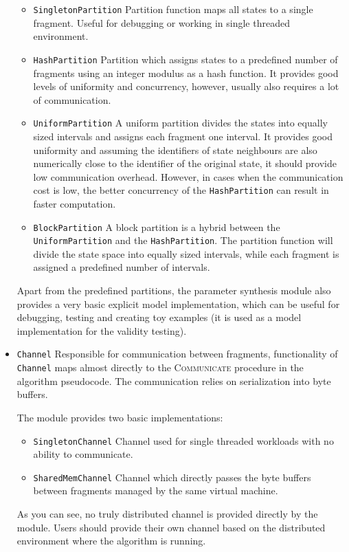 \begin{itemize}
	\begin{itemize}
		\item \texttt{SingletonPartition} Partition function maps all states to a single fragment. Useful for debugging or working in single threaded environment.
		\item \texttt{HashPartition} Partition which assigns states to a predefined number of fragments using an integer modulus as a hash function. It provides good levels of uniformity and concurrency, however, usually also requires a lot of communication.
		\item \texttt{UniformPartition} A uniform partition divides the states into equally sized intervals and assigns each fragment one interval. It provides good uniformity and assuming the identifiers of state neighbours are also numerically close to the identifier of the original state, it should provide low communication overhead. However, in cases when the communication cost is low, the better concurrency of the \texttt{HashPartition} can result in faster computation.
		\item \texttt{BlockPartition} A block partition is a hybrid between the \texttt{UniformPartition} and the \texttt{HashPartition}. The partition function will divide the state space into equally sized intervals, while each fragment is assigned a predefined number of intervals.
	\end{itemize}

	Apart from the predefined partitions, the parameter synthesis module also provides a very basic explicit model implementation, which can be useful for debugging, testing and creating toy examples (it is used as a model implementation for the validity testing).

	\item \texttt{Channel} Responsible for communication between fragments, functionality of \texttt{Channel} maps almost directly to the \textsc{Communicate} procedure in the algorithm pseudocode. The communication relies on serialization into byte buffers.
	
	The module provides two basic implementations:
	
	\begin{itemize}
		\item \texttt{SingletonChannel} Channel used for single threaded workloads with no ability to communicate.
		\item \texttt{SharedMemChannel} Channel which directly passes the byte buffers between fragments managed by the same virtual machine.
	\end{itemize}

	As you can see, no truly distributed channel is provided directly by the module. Users should provide their own channel based on the distributed environment where the algorithm is running.

\end{itemize}

